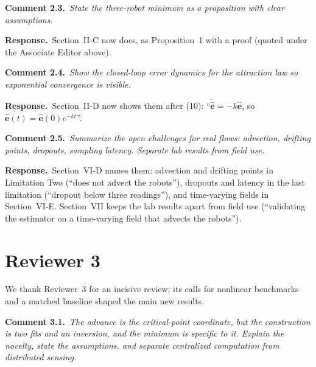 \documentclass[10pt]{article}
\newcommand{\cmt}[2]{\textbf{Comment #1.}~\textit{#2}\par}
\newcommand{\resp}{\par\textbf{Response.}~}
\begin{document}
\cmt{2.3}{State the three-robot minimum as a proposition with clear assumptions.}

\resp Section~II-C now does, as Proposition~1 with a proof (quoted under the Associate Editor above).

\cmt{2.4}{Show the closed-loop error dynamics for the attraction law so exponential convergence is visible.}

\resp Section~II-D now shows them after (10): ``$\dot{\hat{\mathbf{e}}} = -k\hat{\mathbf{e}}$, so $\hat{\mathbf{e}}(t) = \hat{\mathbf{e}}(0)e^{-kt}$''.

\cmt{2.5}{Summarize the open challenges for real flows: advection, drifting points, dropouts, sampling latency. Separate lab results from field use.}

\resp Section~VI-D names them: advection and drifting points in Limitation Two (``does not advect the robots''), dropouts and latency in the last limitation (``dropout below three readings''), and time-varying fields in Section~VI-E. Section~VII keeps the lab results apart from field use (``validating the estimator on a time-varying field that advects the robots'').

\newpage
\section*{Reviewer 3}

We thank Reviewer~3 for an incisive review; its calls for nonlinear benchmarks and a matched baseline shaped the main new results.

\cmt{3.1}{The advance is the critical-point coordinate, but the construction is two fits and an inversion, and the minimum is specific to it. Explain the novelty, state the assumptions, and separate centralized computation from distributed sensing.}
\end{document}
